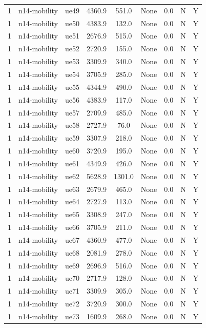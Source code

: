\begin{table}[ht]
\begin{tabular}{|c|c|c|c|c|c|c|c|c|}
1 & n14-mobility & ue49 & 4360.9 & 551.0 & None & 0.0 & N & Y \\
1 & n14-mobility & ue50 & 4383.9 & 132.0 & None & 0.0 & N & Y \\
1 & n14-mobility & ue51 & 2676.9 & 515.0 & None & 0.0 & N & Y \\
1 & n14-mobility & ue52 & 2720.9 & 155.0 & None & 0.0 & N & Y \\
1 & n14-mobility & ue53 & 3309.9 & 340.0 & None & 0.0 & N & Y \\
1 & n14-mobility & ue54 & 3705.9 & 285.0 & None & 0.0 & N & Y \\
1 & n14-mobility & ue55 & 4344.9 & 490.0 & None & 0.0 & N & Y \\
1 & n14-mobility & ue56 & 4383.9 & 117.0 & None & 0.0 & N & Y \\
1 & n14-mobility & ue57 & 2709.9 & 485.0 & None & 0.0 & N & Y \\
1 & n14-mobility & ue58 & 2727.9 & 76.0 & None & 0.0 & N & Y \\
1 & n14-mobility & ue59 & 3307.9 & 218.0 & None & 0.0 & N & Y \\
1 & n14-mobility & ue60 & 3720.9 & 195.0 & None & 0.0 & N & Y \\
1 & n14-mobility & ue61 & 4349.9 & 426.0 & None & 0.0 & N & Y \\
1 & n14-mobility & ue62 & 5628.9 & 1301.0 & None & 0.0 & N & Y \\
1 & n14-mobility & ue63 & 2679.9 & 465.0 & None & 0.0 & N & Y \\
1 & n14-mobility & ue64 & 2727.9 & 113.0 & None & 0.0 & N & Y \\
1 & n14-mobility & ue65 & 3308.9 & 247.0 & None & 0.0 & N & Y \\
1 & n14-mobility & ue66 & 3705.9 & 211.0 & None & 0.0 & N & Y \\
1 & n14-mobility & ue67 & 4360.9 & 477.0 & None & 0.0 & N & Y \\
1 & n14-mobility & ue68 & 2081.9 & 278.0 & None & 0.0 & N & Y \\
1 & n14-mobility & ue69 & 2696.9 & 516.0 & None & 0.0 & N & Y \\
1 & n14-mobility & ue70 & 2717.9 & 128.0 & None & 0.0 & N & Y \\
1 & n14-mobility & ue71 & 3309.9 & 305.0 & None & 0.0 & N & Y \\
1 & n14-mobility & ue72 & 3720.9 & 300.0 & None & 0.0 & N & Y \\
1 & n14-mobility & ue73 & 1609.9 & 268.0 & None & 0.0 & N & Y \\

\end{tabular}
\end{table}

